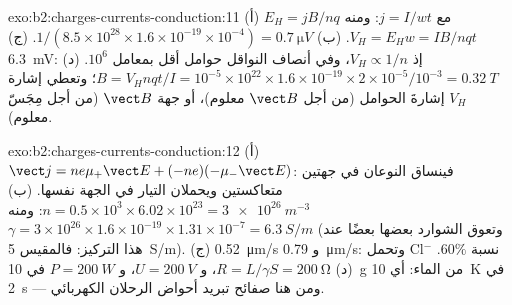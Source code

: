\begin{solution}{exo:b2:charges-currents-conduction:11}
(أ) $E_H = jB/nq$ مع $j = I/wt$: ومنه $V_H = E_Hw = IB/nqt$. (ب) $1/(8.5 \times 10^{28}
\times 1.6 \times 10^{-19} \times 10^{-4}) = \qty{0.7}{\micro V}$. (ج) \qty{6.3}{mV}: إذ $V_H \propto 1/n$،
وفي أنصاف النواقل حوامل أقل بمعامل $10^6$. (د) $B = V_Hnqt/I =
10^{-5} \times 10^{22} \times 1.6 \times 10^{-19} \times 2 \times 10^{-5}/10^{-3} = \qty{0.32}{T}$؛ وتعطي إشارة
$V_H$ إشارةَ الحوامل (من أجل $\vect B$ معلوم)، أو
جهة $\vect B$ (من أجل مِجَسّ معلوم).
\end{solution}

\begin{solution}{exo:b2:charges-currents-conduction:12}
(أ) $\vect j = ne\mu_+\vect E + (-ne)(-\mu_-\vect E)$: فينساق النوعان في
جهتين متعاكستين ويحملان التيار في الجهة نفسها. (ب) $n =
0.5 \times 10^3 \times 6.02 \times 10^{23} = \qty{3e26}{m^{-3}}$: ومنه $\gamma = 3 \times 10^{26} \times 1.6 \times 10^{-19}
\times 1.31 \times 10^{-7} = \qty{6.3}{S/m}$ (وتعوق الشوارد بعضها بعضًا عند هذا
التركيز: فالمقيس \qty{5}{S/m}). (ج) \qty{0.52}{\micro m/s} و \qty{0.79}{\micro m/s}:
وتحمل Cl$^-$ نسبة $60\%$. (د) $R = L/\gamma S = \qty{200}{\ohm}$، و $U = \qty{200}{V}$، و $P =
\qty{200}{W}$ في \qty{10}{g} من الماء: أي \qty{10}{K} في \qty{2}{s} --- ومن هنا صفائح
تبريد أحواض الرحلان الكهربائي.
\end{solution}

